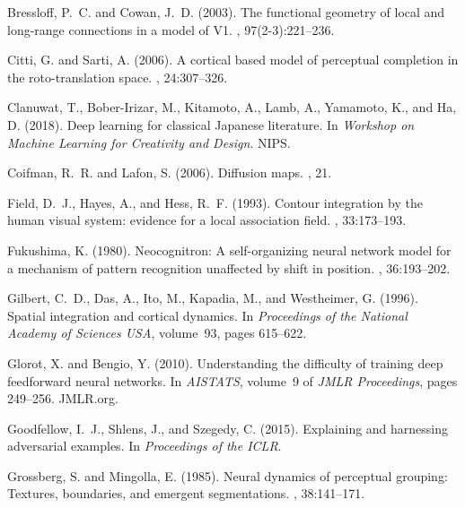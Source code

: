 \documentclass[11pt,oneside,reqno]{amsart}
\begin{document}
\begin{thebibliography}{}
Bressloff, P.~C. and Cowan, J.~D. (2003).
\newblock The functional geometry of local and long-range connections in a
  model of {V}1.
, 97(2-3):221--236.

Citti, G. and Sarti, A. (2006).
\newblock A cortical based model of perceptual completion in the
  roto-translation space.
,
  24:307--326.

Clanuwat, T., Bober-Irizar, M., Kitamoto, A., Lamb, A., Yamamoto, K., and Ha,
  D. (2018).
\newblock Deep learning for classical {J}apanese literature.
\newblock In {\em Workshop on Machine Learning for Creativity and Design}.
  NIPS.

Coifman, R.~R. and Lafon, S. (2006).
\newblock Diffusion maps.
, 21.

Field, D.~J., Hayes, A., and Hess, R.~F. (1993).
\newblock Contour integration by the human visual system: evidence for a local
  association field.
, 33:173--193.

Fukushima, K. (1980).
\newblock Neocognitron: A self-organizing neural network model for a mechanism
  of pattern recognition unaffected by shift in position.
, 36:193--202.

Gilbert, C.~D., Das, A., Ito, M., Kapadia, M., and Westheimer, G. (1996).
\newblock Spatial integration and cortical dynamics.
\newblock In {\em Proceedings of the National Academy of Sciences USA},
  volume~93, pages 615--622.

Glorot, X. and Bengio, Y. (2010).
\newblock Understanding the difficulty of training deep feedforward neural
  networks.
\newblock In {\em {AISTATS}}, volume~9 of {\em {JMLR} Proceedings}, pages
  249--256. JMLR.org.

Goodfellow, I.~J., Shlens, J., and Szegedy, C. (2015).
\newblock Explaining and harnessing adversarial examples.
\newblock In {\em Proceedings of the ICLR}.

Grossberg, S. and Mingolla, E. (1985).
\newblock Neural dynamics of perceptual grouping: Textures, boundaries, and
  emergent segmentations.
, 38:141--171.


\end{thebibliography}
\end{document}
